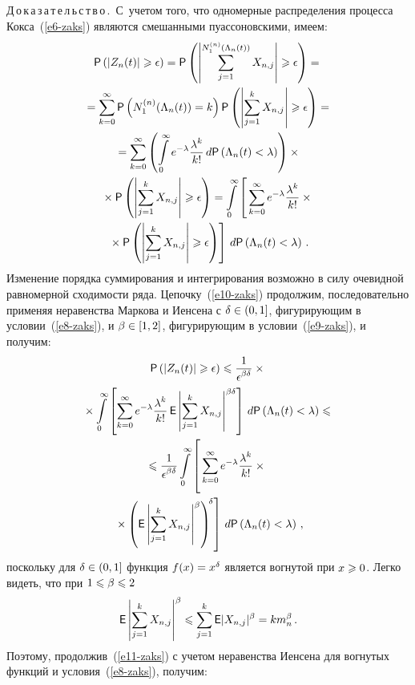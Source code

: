 \begin{multicols}{2}
\smallskip

\noindent
Д\,о\,к\,а\,з\,а\,т\,е\,л\,ь\,с\,т\,в\,о\,.\ С~учетом того, что одномерные
распределения процесса Кокса~(\ref{e6-zaks}) являются смешанными пуассоновскими,
имеем:
\begin{multline}
{\sf P}\left(|Z_n(t)|\geqslant\epsilon\right)=
{\sf P}\left(\left|\sum\limits_{j=1}^{N^{(n)}_1(\Lambda_n(t))}X_{n,j}\right|\geqslant\epsilon\right)={}\\
{}=
\sum\limits_{k=0}^{\infty}{\sf P}\left(N^{(n)}_1(\Lambda_n(t))=k\right){\sf
P}\left(\left\vert\sum\limits_{j=1}^kX_{n,j}\right\vert \geqslant\epsilon\right)={}
\\
{}=\sum\limits_{k=0}^{\infty}\left(\int\limits_{0}^{\infty}
e^{-\lambda}\fr{\lambda^k}{k!}\,d {\sf P}\left(\Lambda_n(t)<\lambda\right)\right)\times{}\\
{}\times{\sf P}
\left(\left\vert \sum\limits_{j=1}^kX_{n,j}\right\vert\geqslant\epsilon\right)=
\int\limits_{0}^{\infty}\left[
\vphantom{\left(\left\vert\sum\limits_{j=1}^kX_{n,j}\right\vert
\geqslant\epsilon\right)}
\sum\limits_{k=0}^{\infty}e^{-\lambda}\fr{\lambda^k}{k!}
\times{}\right.\\
\left.{}\times {\sf P}\left(\left\vert\sum\limits_{j=1}^kX_{n,j}\right\vert
\geqslant\epsilon\right)
\right]\,d{\sf P}\left(\Lambda_n(t)<\lambda\right)\,.\label{e10-zaks}
\end{multline}
Изменение порядка суммирования и интегрирования возможно в силу
очевидной равномерной сходимости ряда. Цепочку~(\ref{e10-zaks}) продолжим,
последовательно применяя неравенства Маркова и Иенсена с
$\delta\hm\in(0,1]$, фигурирующим в условии~(\ref{e8-zaks}), и $\beta\hm\in[1,2]$,
фигурирующим в условии~(\ref{e9-zaks}), и получим:
\begin{multline}
{\sf P}\left(|Z_n(t)|\geqslant\epsilon\right)\leqslant
\fr{1}{\epsilon^{\beta\delta}}\times{}\\
{}\times\int\limits_{0}^{\infty}\left[
\sum\limits_{k=0}^{\infty}e^{-\lambda}\fr{\lambda^k}{k!}\,{\sf
E}\left\vert \sum\limits_{j=1}^kX_{n,j}\right\vert^{\beta\delta}\right]\,
d{\sf P}\left(\Lambda_n(t)<\lambda\right) \leqslant{}
\\
\leqslant
\fr{1}{\epsilon^{\beta\delta}}\int\limits_{0}^{\infty}\left[
\vphantom{\left({\sf E}\left|\sum\limits_{j=1}^kX_{n,j}\right|^{\beta}\right)^{\delta}}
\sum\limits_{k=0}^{\infty}e^{-\lambda}\fr{\lambda^k}{k!}\times{}\right.\\
\left.{}\times
\left({\sf E}\left|\sum\limits_{j=1}^kX_{n,j}\right|^{\beta}\right)^{\!\delta}\right]\,d{\sf P}\left(\Lambda_n(t)<\lambda\right)\,,
\label{e11-zaks}
\end{multline}
поскольку для $\delta\hm\in(0,1]$ функция $f(x)\hm=x^{\delta}$ является
вогнутой при $x\hm\geqslant0$. Легко видеть, что при $1\hm\leqslant\beta\hm\leqslant2$
$$
{\sf E}\left|\sum\limits_{j=1}^kX_{n,j}\right|^{\beta}\leqslant\sum\limits_{j=1}^k{\sf E}|X_{n,j}|^{\beta}=km_n^{\beta}\,.
$$
Поэтому, продолжив~(\ref{e11-zaks}) с учетом неравенства Иенсена для вогнутых
функций и условия~(\ref{e8-zaks}), получим:


\end{multicols}
